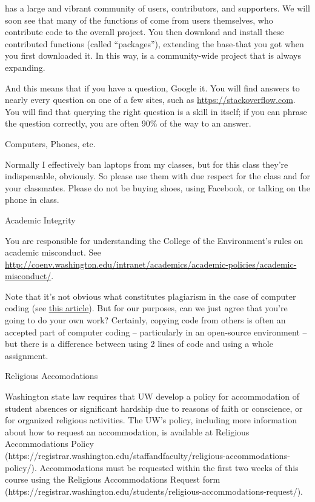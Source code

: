 \documentclass[11pt,letterpaper]{article}
\begin{document}
\R has a large and vibrant community of users, contributors, and supporters. We will soon see that many of the functions of \R come from users themselves, who contribute code to the overall project. You then download and install these contributed functions (called ``packages''), extending the base-\R that you got when you first downloaded it. In this way, \R is a community-wide project that is always expanding. 

And this means that if you have a question, Google it.  You will find answers to nearly every question on one of a few sites, such as \url{https://stackoverflow.com}. You will find that querying the right question is a skill in itself; if you can phrase the question correctly, you are often 90\% of the way to an answer.

\newpage

{\Large Computers, Phones, etc.}\hrulefill

Normally I effectively ban laptops from my classes, but for this class they're indispensable, obviously. So please use them with due respect for the class and for your classmates. Please do not be buying shoes, using Facebook, or talking on the phone in class.

{\Large Academic Integrity}\hrulefill

You are responsible for understanding the College of the Environment's
rules on academic misconduct. See
\url{http://coenv.washington.edu/intranet/academics/academic-policies/academic-misconduct/}.

Note that it's not obvious what constitutes plagiarism in the case of computer coding (see \href{https://www.nytimes.com/2017/05/29/us/computer-science-cheating.html}{\underline{this article}}). But for our purposes, can we just agree that you're going to do your own work? Certainly, copying code from others is often an accepted part of computer coding -- particularly in an open-source environment -- but there is a difference between using 2 lines of code and using a whole assignment.


{\Large Religious Accomodations}\hrulefill

\begin{sloppypar}
Washington state law requires that UW develop a policy for accommodation of student absences or significant hardship due to reasons of faith or conscience, or for organized religious activities. The UW’s policy, including more information about how to request an accommodation, is available at Religious Accommodations Policy (https://registrar.washington.edu/staffandfaculty/religious-accommodations-policy/). Accommodations must be requested within the first two weeks of this course using the Religious Accommodations Request form (https://registrar.washington.edu/students/religious-accommodations-request/).	
\end{sloppypar}
\end{document}
